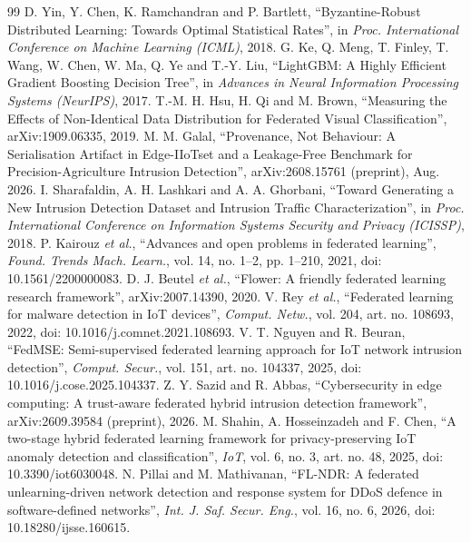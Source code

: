 \documentclass[12pt,a4paper]{report}
\begin{document}
\begin{thebibliography}{99}
 D. Yin, Y. Chen, K. Ramchandran and P. Bartlett, ``Byzantine-Robust Distributed Learning: Towards Optimal Statistical Rates'', in \textit{Proc. International Conference on Machine Learning (ICML)}, 2018.
 G. Ke, Q. Meng, T. Finley, T. Wang, W. Chen, W. Ma, Q. Ye and T.-Y. Liu, ``LightGBM: A Highly Efficient Gradient Boosting Decision Tree'', in \textit{Advances in Neural Information Processing Systems (NeurIPS)}, 2017.
 T.-M. H. Hsu, H. Qi and M. Brown, ``Measuring the Effects of Non-Identical Data Distribution for Federated Visual Classification'', arXiv:1909.06335, 2019.
 M. M. Galal, ``Provenance, Not Behaviour: A Serialisation Artifact in Edge-IIoTset and a Leakage-Free Benchmark for Precision-Agriculture Intrusion Detection'', arXiv:2608.15761 (preprint), Aug. 2026.
 I. Sharafaldin, A. H. Lashkari and A. A. Ghorbani, ``Toward Generating a New Intrusion Detection Dataset and Intrusion Traffic Characterization'', in \textit{Proc. International Conference on Information Systems Security and Privacy (ICISSP)}, 2018.
 P. Kairouz \textit{et al.}, ``Advances and open problems in federated learning'', \textit{Found. Trends Mach. Learn.}, vol. 14, no. 1--2, pp. 1--210, 2021, doi: 10.1561/2200000083.
 D. J. Beutel \textit{et al.}, ``Flower: A friendly federated learning research framework'', arXiv:2007.14390, 2020.
 V. Rey \textit{et al.}, ``Federated learning for malware detection in IoT devices'', \textit{Comput. Netw.}, vol. 204, art. no. 108693, 2022, doi: 10.1016/j.comnet.2021.108693.
 V. T. Nguyen and R. Beuran, ``FedMSE: Semi-supervised federated learning approach for IoT network intrusion detection'', \textit{Comput. Secur.}, vol. 151, art. no. 104337, 2025, doi: 10.1016/j.cose.2025.104337.
 Z. Y. Sazid and R. Abbas, ``Cybersecurity in edge computing: A trust-aware federated hybrid intrusion detection framework'', arXiv:2609.39584 (preprint), 2026.
 M. Shahin, A. Hosseinzadeh and F. Chen, ``A two-stage hybrid federated learning framework for privacy-preserving IoT anomaly detection and classification'', \textit{IoT}, vol. 6, no. 3, art. no. 48, 2025, doi: 10.3390/iot6030048.
 N. Pillai and M. Mathivanan, ``FL-NDR: A federated unlearning-driven network detection and response system for DDoS defence in software-defined networks'', \textit{Int. J. Saf. Secur. Eng.}, vol. 16, no. 6, 2026, doi: 10.18280/ijsse.160615.

\end{thebibliography}
\end{document}
